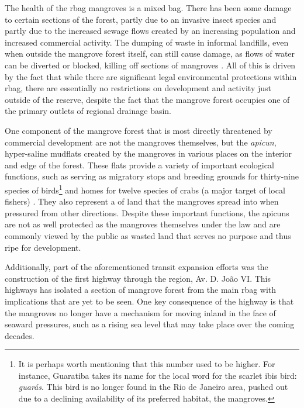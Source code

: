 The health of the \ac{rbag} mangroves is a mixed bag. There has been some damage to certain sections of the forest, partly due to an invasive insect species and partly due to the increased sewage flows created by an increasing population and increased commercial activity. The dumping of waste in informal landfills, even when outside the mangrove forest itself, can still cause damage, as flows of water can be diverted or blocked, killing off sections of mangroves \cite{castroOSDESAFIOSPLANEJAMENTO2012}. All of this is driven by the fact that while there are significant legal environmental protections within \ac{rbag}, there are essentially no restrictions on development and activity just outside of the reserve, despite the fact that the mangrove forest occupies one of the primary outlets of regional drainage basin.

One component of the mangrove forest that is most directly threatened by commercial development are not the mangroves themselves, but the \textit{apicun}, hyper-saline mudflats created by the mangroves in various places on the interior and edge of the forest. These flats provide a variety of important ecological functions, such as serving as migratory stops and breeding grounds for thirty-nine species of birds\footnote{It is perhaps worth mentioning that this number used to be higher. For instance, Guaratiba takes its name for the local word for the scarlet ibis bird: \textit{guarás}. This bird is no longer found in the Rio de Janeiro area, pushed out due to a declining availability of its preferred habitat, the mangroves.} and homes for twelve species of crabs (a major target of local fishers) \cite{vicenteAvaliacaoHidrogeologicaRegioes2010}. They also represent a of land that the mangroves spread into when pressured from other directions. Despite these important functions, the apicuns are not as well protected as the mangroves themselves under the law and are commonly viewed by the public as wasted land that serves no purpose and thus ripe for development.

Additionally, part of the aforementioned transit expansion efforts was the construction of the first highway through the region, Av. D. João VI. This highways has isolated a section of mangrove forest from the main \ac{rbag} with implications that are yet to be seen. One key consequence of the highway is that the mangroves no longer have a mechanism for moving inland in the face of seaward pressures, such as a rising sea level that may take place over the coming decades.

